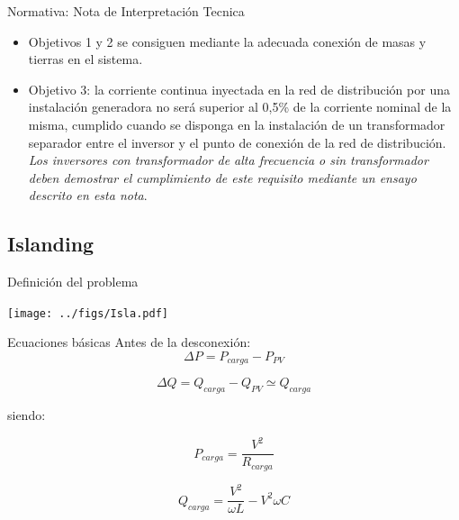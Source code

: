 \documentclass[xcolor={usenames,svgnames,dvipsnames}]{beamer}
\begin{document}
\begin{frame}[label={sec:orgaa705f0}]{Normativa: Nota de Interpretación Tecnica}
\begin{itemize}
\item Objetivos 1 y 2 se consiguen mediante la adecuada conexión de masas y tierras en el sistema.

\item Objetivo 3: \guillemotleft{}\alert{la corriente continua inyectada en la red de distribución por una instalación generadora no será superior al 0,5\% de la corriente nominal de la misma}\guillemotright{}, cumplido \guillemotleft{}\alert{cuando se disponga en la instalación de un transformador separador entre el inversor y el punto de conexión de la red de distribución}\guillemotright{}. \emph{Los inversores con transformador de alta frecuencia o sin transformador deben demostrar el cumplimiento de este requisito mediante un ensayo descrito en esta nota}.
\end{itemize}
\end{frame}

\subsection{Islanding}
\label{sec:org5e6e035}
\begin{frame}[label={sec:org52c1310}]{Definición del problema}
\begin{center}
\texttt{[image: ../figs/Isla.pdf]}
\end{center}
\end{frame}

\begin{frame}[label={sec:org488a5a7}]{Ecuaciones básicas}
Antes de la desconexión:$$\Delta P=P_{carga}-P_{PV}$$

$$\Delta Q=Q_{carga}-Q_{PV}\simeq Q_{carga}$$

siendo:

$$P_{carga}=\frac{V^{2}}{R_{carga}}$$

$$Q_{carga}=\frac{V^{2}}{\omega L}-V^{2}\omega C$$
\end{frame}
\end{document}

